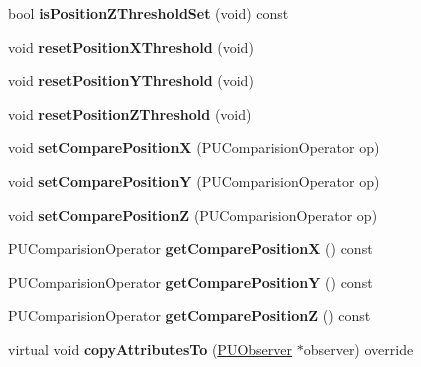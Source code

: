 \begin{DoxyCompactItemize}
\mbox{\label{classPUOnPositionObserver_a04f283891503b73303c5f1a3ab7ea8ec}} 
bool {\bfseries is\+Position\+Z\+Threshold\+Set} (void) const
\item 
\mbox{\label{classPUOnPositionObserver_ab984350151790dabdcd4a8d0fca6f6d7}} 
void {\bfseries reset\+Position\+X\+Threshold} (void)
\item 
\mbox{\label{classPUOnPositionObserver_a5deae2a5c7da5273837b10d835a91bfd}} 
void {\bfseries reset\+Position\+Y\+Threshold} (void)
\item 
\mbox{\label{classPUOnPositionObserver_a3f97c8dd4856dbb81016636ada6991bd}} 
void {\bfseries reset\+Position\+Z\+Threshold} (void)
\item 
\mbox{\label{classPUOnPositionObserver_a421dc33a59f7fdab827feae01a7f80a1}} 
void {\bfseries set\+Compare\+PositionX} (P\+U\+Comparision\+Operator op)
\item 
\mbox{\label{classPUOnPositionObserver_a78f6fb44ed4b2470b6295d24a781cdf9}} 
void {\bfseries set\+Compare\+PositionY} (P\+U\+Comparision\+Operator op)
\item 
\mbox{\label{classPUOnPositionObserver_a0a99e145c26eff473fc48d1b12213b36}} 
void {\bfseries set\+Compare\+PositionZ} (P\+U\+Comparision\+Operator op)
\item 
\mbox{\label{classPUOnPositionObserver_af5560297739859b8e4cf6ad24c0f4193}} 
P\+U\+Comparision\+Operator {\bfseries get\+Compare\+PositionX} () const
\item 
\mbox{\label{classPUOnPositionObserver_a4dc2371fe9eef55ae99ff4a70d0d15a6}} 
P\+U\+Comparision\+Operator {\bfseries get\+Compare\+PositionY} () const
\item 
\mbox{\label{classPUOnPositionObserver_aa8a7c3d2c56ca944879707d63117c3d9}} 
P\+U\+Comparision\+Operator {\bfseries get\+Compare\+PositionZ} () const
\item 
\mbox{\label{classPUOnPositionObserver_a0cdf1f51c2072a28df252ab01c41407b}} 
virtual void {\bfseries copy\+Attributes\+To} (\hyperlink{classPUObserver}{P\+U\+Observer} $\ast$observer) override
\end{DoxyCompactItemize}
